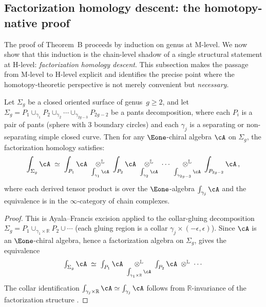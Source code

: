 \subsection{Factorization homology descent: the homotopy-native proof}
\label{subsec:fh-descent}

The proof of Theorem~B proceeds by induction on genus at M-level.
We now show that this induction is the chain-level shadow of a
single structural statement at H-level: \emph{factorization
homology descent}.  This subsection makes the passage from
M-level to H-level explicit and identifies the precise point
where the homotopy-theoretic perspective is not merely convenient
but \emph{necessary}.

\begin{proposition}
\label{prop:pants-excision}
Let $\Sigma_g$ be a closed oriented surface of genus~$g \geq 2$,
and let $\Sigma_g = P_1 \cup_{\gamma_1} P_2 \cup_{\gamma_2}
\cdots \cup_{\gamma_{2g-3}} P_{2g-2}$ be a pants decomposition,
where each $P_i$ is a pair of pants (sphere with $3$ boundary
circles) and each $\gamma_j$ is a separating or non-separating
simple closed curve.  Then for any $\Eone$-chiral algebra $\cA$ on
$\Sigma_g$, the factorization homology satisfies:
\begin{equation}\label{eq:fh-excision}
\int_{\Sigma_g} \cA
\;\simeq\;
\int_{P_1} \cA
\;\underset{\int_{\gamma_1}\cA}{\otimes^{\mathbb{L}}}\;
\int_{P_2} \cA
\;\underset{\int_{\gamma_2}\cA}{\otimes^{\mathbb{L}}}\;
\cdots
\;\underset{\int_{\gamma_{2g-3}}\cA}{\otimes^{\mathbb{L}}}\;
\int_{P_{2g-2}} \cA\,,
\end{equation}
where each derived tensor product is over the $\Eone$-algebra
$\int_{\gamma_j}\cA$ and the equivalence is in the
$\infty$-category of chain complexes.
\end{proposition}

\begin{proof}
This is Ayala--Francis excision \cite{AF15} applied to the
collar-gluing decomposition $\Sigma_g = P_1 \cup_{\gamma_1 \times
\mathbb{R}} P_2 \cup \cdots$ (each gluing region is a collar
$\gamma_j \times (-\epsilon, \epsilon)$).  Since $\cA$ is an
$\Eone$-chiral algebra, hence a factorization algebra on $\Sigma_g$,
\cite[Theorem~3.24]{AF15} gives the equivalence
\[
\textstyle\int_{\Sigma_g}\cA \;\simeq\;
\textstyle\int_{P_1}\cA
\;\underset{\int_{\gamma_1 \times \mathbb{R}}\cA}{\otimes^{\mathbb{L}}}\;
\textstyle\int_{P_2}\cA
\;\underset{}{\otimes^{\mathbb{L}}}\; \cdots
\]
The collar identification
$\int_{\gamma_j \times \mathbb{R}}\cA \simeq \int_{\gamma_j}\cA$
follows from $\mathbb{R}$-invariance of the factorization structure
\cite[Proposition~3.10]{AF15}.
\end{proof}

